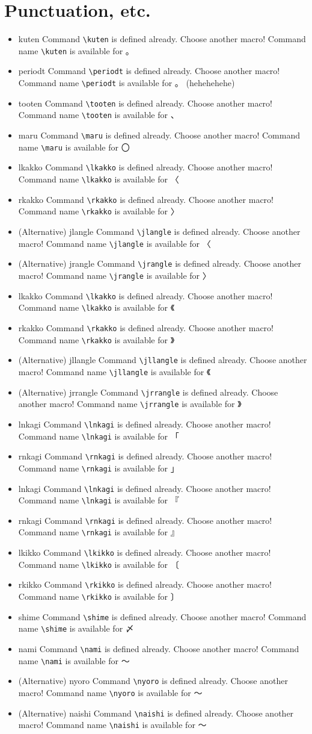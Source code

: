 \documentclass{article}
\newcommand{\checkfor}[1]{%
  \ifcsname#1\endcsname%
    Command \texttt{\textbackslash#1} is defined already. Choose
    another macro!
  \else%
    Command name \texttt{\textbackslash#1} is available for
  \fi%
}
\begin{document}
\section{Punctuation, etc.}
\begin{itemize}
  \item \checkfor{kuten} 。
  \item \checkfor{periodt} 。 (hehehehehe)
  \item \checkfor{tooten} 、
  \item \checkfor{maru} 〇
  \item \checkfor{lkakko} 〈
  \item \checkfor{rkakko} 〉
  \item (Alternative) \checkfor{jlangle} 〈
  \item (Alternative) \checkfor{jrangle} 〉
  \item \checkfor{lkakko} 《
  \item \checkfor{rkakko} 》
  \item (Alternative) \checkfor{jllangle} 《
  \item (Alternative) \checkfor{jrrangle} 》
  \item \checkfor{lnkagi} 「
  \item \checkfor{rnkagi} 」
  \item \checkfor{lnkagi} 『
  \item \checkfor{rnkagi} 』
  \item \checkfor{lkikko} 〔
  \item \checkfor{rkikko} 〕
  \item \checkfor{shime} 〆
  \item \checkfor{nami} ～
  \item (Alternative) \checkfor{nyoro} ～
  \item (Alternative) \checkfor{naishi} ～

\end{itemize}
\end{document}
